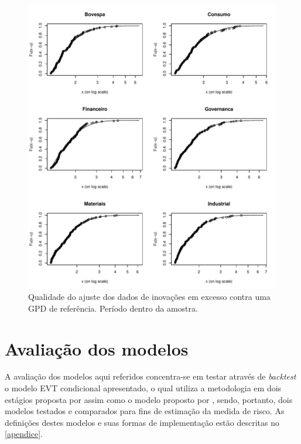 \documentclass[1p]{elsarticle}
\theoremstyle{definition}
\begin{document}
\begin{figure}[H]
	\centering
	\includegraphics[width=1\linewidth]{figs/artigo-gpdfit}
	\caption{Qualidade do ajuste dos dados de inovações em excesso contra uma GPD de referência. Período dentro da amostra.}
	\label{fig:artigo-gpdfit}
\end{figure}

\section{Avaliação dos modelos}
\label{sec:avaliacao}

A avaliação dos modelos aqui referidos concentra-se em testar através de \emph{backtest} o modelo EVT condicional apresentado, o qual utiliza a metodologia em dois estágios proposta por \cite{McNeil2000} assim como o modelo proposto por \cite{RiskMetrics1995}, sendo, portanto, dois modelos testados e comparados para fins de estimação da medida de risco. As definições destes modelos e suas formas de implementação estão descritas no \ref{apendice}.

\end{document}
